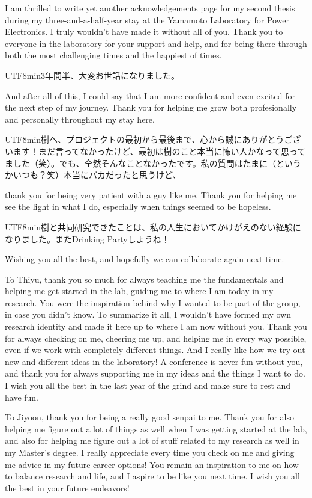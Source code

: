 \footnotesize
\singlespacing
\par I am thrilled to write yet another acknowledgements page for my second thesis during my three-and-a-half-year stay at the Yamamoto Laboratory for Power Electronics. I truly wouldn't have made it without all of you. Thank you to everyone in the laboratory for your support and help, and for being there through both the most challenging times and the happiest of times. \begin{CJK}{UTF8}{min}3年間半、大変お世話になりました。\end{CJK} And after all of this, I could say that I am more confident and even excited for the next step of my journey. Thank you for helping me grow both profesionally and personally throughout my stay here.

\par \begin{CJK}{UTF8}{min}樹へ、プロジェクトの最初から最後まで、心から誠にありがとうございます！まだ言ってなかったけど、最初は樹のこと本当に怖い人かなって思ってました（笑）。でも、全然そんなことなかったです。私の質問はたまに（というかいつも？笑）本当にバカだったと思うけど、\end{CJK}thank you for being very patient with a guy like me. Thank you for helping me see the light in what I do, especially when things seemed to be hopeless. \begin{CJK}{UTF8}{min}樹と共同研究できたことは、私の人生においてかけがえのない経験になりました。またDrinking Partyしようね！\end{CJK} Wishing you all the best, and hopefully we can collaborate again next time. 

\par To Thiyu, thank you so much for always teaching me the fundamentals and helping me get started in the lab, guiding me to where I am today in my research. You were the inspiration behind why I wanted to be part of the group, in case you didn't know. To summarize it all, I wouldn't have formed my own research identity and made it here up to where I am now without you. Thank you for always checking on me, cheering me up, and helping me in every way possible, even if we work with completely different things. And I really like how we try out new and different ideas in the laboratory! A conference is never fun without you, and thank you for always supporting me in my ideas and the things I want to do. I wish you all the best in the last year of the grind and make sure to rest and have fun.
\par To Jiyoon, thank you for being a really good senpai to me. Thank you for also helping me figure out a lot of things as well when I was getting started at the lab, and also for helping me figure out a lot of stuff related to my research as well in my Master's degree. I really appreciate every time you check on me and giving me advice in my future career options! You remain an inspiration to me on how to balance research and life, and I aspire to be like you next time. I wish you all the best in your future endeavors!

